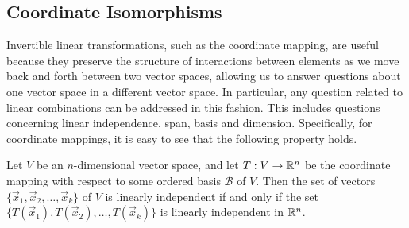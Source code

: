 \documentclass{ximera}
\begin{document}
\begin{example}
\begin{center}
\end{center}

\end{example}

\subsection*{Coordinate Isomorphisms}

Invertible linear transformations, such as the coordinate mapping, are useful because they preserve the structure of interactions between elements as we move back and forth between two vector spaces, allowing us to answer questions about one vector space in a different vector space.  In particular, any question related to linear combinations can be addressed in this fashion. This includes questions concerning linear independence, span, basis and dimension. Specifically, for coordinate mappings, it is easy to see that the following property holds.

\begin{theorem}\label{th:coordmappingisoprop}
    Let $V$ be an $n$-dimensional vector space, and let $T:V\rightarrow \mathbb{R}^n$ be the coordinate mapping with respect to some ordered basis $\mathcal{B}$ of $V$.  Then
    the set of vectors $\{\vec{x}_1,\vec{x}_2,\dots ,\vec{x}_k\}$ of $V$ is linearly independent if and only if the set $\{T(\vec{x}_1),T(\vec{x}_2),\dots ,T(\vec{x}_k)\}$ is linearly independent in $\mathbb{R}^n$.
\end{theorem}
\end{document}

